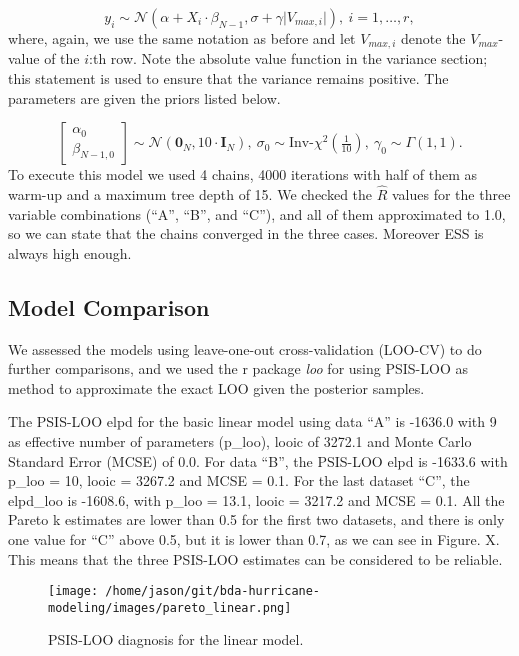 \documentclass[
]{article}
\begin{document}
\[ y_{i} \sim \mathcal{N}(\alpha + X_i \cdot\beta_{N-1}, \sigma + \gamma\vert V_{max,i} \vert ), \ i=1,\dots,r, \]
where, again, we use the same notation as before and let \(V_{max,i}\)
denote the \(V_{max}\)-value of the \(i\):th row. Note the absolute
value function in the variance section; this statement is used to ensure
that the variance remains positive. The parameters are given the priors
listed below.

\[\begin{bmatrix} \alpha_0 \\ \beta_{N-1,0} \end{bmatrix} \sim \mathcal{N}(\mathbf{0}_N, 10 \cdot \mathbf{I}_N), \ \sigma_0 \sim \textrm{Inv-}\chi^2(\tfrac{1}{10}), \ \gamma_0 \sim \Gamma(1,1) .\]
To execute this model we used 4 chains, 4000 iterations with half of
them as warm-up and a maximum tree depth of 15. We checked the
\(\hat{R}\) values for the three variable combinations (``A'', ``B'',
and ``C''), and all of them approximated to 1.0, so we can state that
the chains converged in the three cases. Moreover ESS is always high
enough.

\hypertarget{model-comparison}{%
\subsection{Model Comparison}\label{model-comparison}}

We assessed the models using leave-one-out cross-validation (LOO-CV) to
do further comparisons, and we used the r package \emph{loo} for using
PSIS-LOO as method to approximate the exact LOO given the posterior
samples.

The PSIS-LOO elpd for the basic linear model using data ``A'' is -1636.0
with 9 as effective number of parameters (p\_loo), looic of 3272.1 and
Monte Carlo Standard Error (MCSE) of 0.0. For data ``B'', the PSIS-LOO
elpd is -1633.6 with p\_loo = 10, looic = 3267.2 and MCSE = 0.1. For the
last dataset ``C'', the elpd\_loo is -1608.6, with p\_loo = 13.1, looic
= 3217.2 and MCSE = 0.1. All the Pareto k estimates are lower than 0.5
for the first two datasets, and there is only one value for ``C'' above
0.5, but it is lower than 0.7, as we can see in Figure. X. This means
that the three PSIS-LOO estimates can be considered to be reliable.

\begin{figure}
\centering
\texttt{[image: /home/jason/git/bda-hurricane-modeling/images/pareto\_linear.png]}
\caption{PSIS-LOO diagnosis for the linear model.}
\end{figure}
\end{document}
